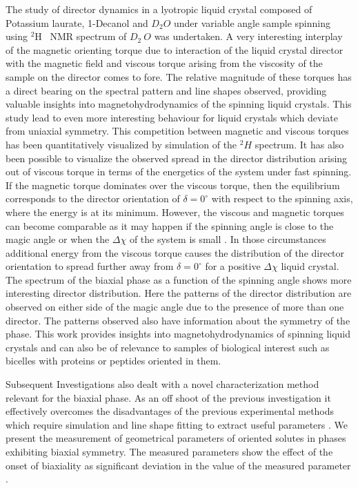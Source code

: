 The study of director dynamics in a lyotropic liquid crystal composed of
Potassium laurate, 1-Decanol and $D_2 O $ \cite{chap22-key6} under variable angle sample spinning
using ${}^2$H~ NMR spectrum of $D_2~ O$ was undertaken. A very interesting interplay of
the magnetic orienting torque due to interaction of the liquid crystal director with
the magnetic field and viscous torque arising from the viscosity of the sample on
the director comes to fore. The relative magnitude of these torques has a direct
bearing on the spectral pattern and line shapes observed, providing valuable
insights into magnetohydrodynamics of the spinning liquid crystals. This study
lead to even more interesting behaviour for liquid crystals which deviate from
uniaxial symmetry. This competition between magnetic and viscous torques has
been quantitatively visualized by simulation of the ${}^2H$ spectrum. It has also been
possible to visualize the observed spread in the director distribution arising out of
viscous torque in terms of the energetics of the system under fast spinning. If the
magnetic torque dominates over the viscous torque, then the equilibrium
corresponds to the director orientation of $\delta = 0^\circ$ with respect to the spinning axis,
where the energy is at its minimum. However, the viscous and magnetic torques
can become comparable as it may happen if the spinning angle is close to the
magic angle or when the $\Delta \chi$ of the system is small \cite{chap22-key7}. In those circumstances
additional energy from the viscous torque causes the distribution of the director
orientation to spread further away from $\delta = 0^{\circ}$ for a positive $\Delta\chi$ liquid crystal.
The spectrum of the biaxial phase \cite{chap22-key8} as a function of the spinning angle shows
more interesting director distribution. Here the patterns of the director distribution
are observed on either side of the magic angle due to the presence of more than
one director. The patterns observed also have information about the symmetry of
the phase. This work provides insights into magnetohydrodynamics of spinning
liquid crystals and can also be of relevance to samples of biological interest such
as bicelles with proteins or peptides oriented in them. \cite{chap22-key9}

Subsequent Investigations also dealt with a novel characterization method
relevant for the biaxial phase. As an off shoot of the previous investigation it
effectively overcomes the disadvantages of the previous experimental methods
which require simulation and line shape fitting to extract useful parameters \cite{chap22-key10}.
We present the measurement of geometrical parameters of oriented solutes in
phases exhibiting biaxial symmetry. The measured parameters show the effect of
the onset of biaxiality as significant deviation in the value of the measured
parameter \cite{chap22-key11}.


